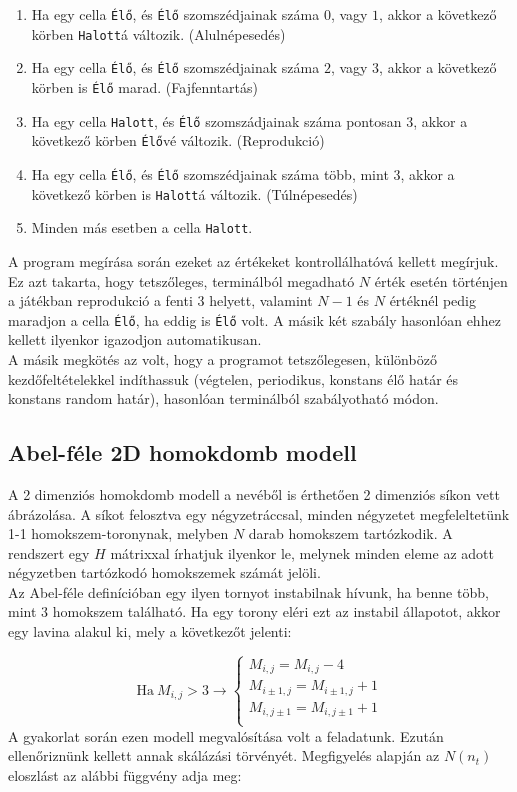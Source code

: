 \begin{multicols}{2}
\begin{enumerate}
    \item Ha egy cella \texttt{Élő}, és \texttt{Élő} szomszédjainak száma $0$, vagy $1$, akkor a következő körben \texttt{Halott}á változik. (Alulnépesedés)
    \item Ha egy cella \texttt{Élő}, és \texttt{Élő} szomszédjainak száma $2$, vagy $3$, akkor a következő körben is \texttt{Élő} marad. (Fajfenntartás)
    \item Ha egy cella \texttt{Halott}, és \texttt{Élő} szomszádjainak száma pontosan $3$, akkor a következő körben \texttt{Élő}vé változik. (Reprodukció)
    \item Ha egy cella \texttt{Élő}, és \texttt{Élő} szomszédjainak száma több, mint $3$, akkor a következő körben is \texttt{Halott}á változik. (Túlnépesedés)
    \item Minden más esetben a cella \texttt{Halott}.
\end{enumerate}
A program megírása során ezeket az értékeket kontrollálhatóvá kellett megírjuk. Ez azt takarta, hogy tetszőleges, terminálból megadható $N$ érték esetén történjen a játékban reprodukció a fenti $3$ helyett, valamint $N-1$ és $N$ értéknél pedig maradjon a cella \texttt{Élő}, ha eddig is \texttt{Élő} volt. A másik két szabály hasonlóan ehhez kellett ilyenkor igazodjon automatikusan. \\
A másik megkötés az volt, hogy a programot tetszőlegesen, különböző kezdőfeltételekkel indíthassuk (végtelen, periodikus, konstans élő határ és konstans random határ), hasonlóan terminálból szabályotható módon.

\subsection{Abel-féle 2D homokdomb modell} \label{sub:2.2}
A 2 dimenziós homokdomb modell a nevéből is érthetően  2 dimenziós síkon vett ábrázolása. A síkot felosztva egy négyzetráccsal, minden négyzetet megfeleltetünk 1-1 homokszem-toronynak, melyben $N$ darab homokszem tartózkodik. A rendszert egy $H$ mátrixxal írhatjuk ilyenkor le, melynek minden eleme az adott négyzetben tartózkodó homokszemek számát jelöli. \\
Az Abel-féle definícióban egy ilyen tornyot instabilnak hívunk, ha benne több, mint $3$ homokszem található. Ha egy torony eléri ezt az instabil állapotot, akkor egy lavina alakul ki, mely a következőt jelenti:

\begin{equation}
    \text{Ha} \ M_{i,j} > 3
    \to
    \begin{cases}
        M_{i,j} = M_{i,j} - 4 \\
        M_{i\pm1,j} = M_{i\pm1,j} + 1 \\
        M_{i,j\pm1} = M_{i,j\pm1} + 1 \\
    \end{cases}
\end{equation}
A gyakorlat során ezen modell megvalósítása volt a feladatunk. Ezután ellenőriznünk kellett annak skálázási törvényét. Megfigyelés alapján az $N \left( n_{t} \right)$ eloszlást az alábbi függvény adja meg:


\end{multicols}
